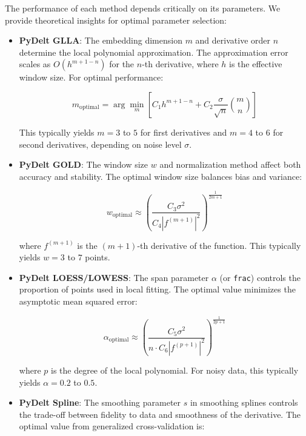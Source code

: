 \documentclass[10pt,journal,compsoc]{IEEEtran}
\begin{document}
The performance of each method depends critically on its parameters. We provide theoretical insights for optimal parameter selection:

\begin{itemize}
    \item \textbf{PyDelt GLLA}: The embedding dimension $m$ and derivative order $n$ determine the local polynomial approximation. The approximation error scales as $O(h^{m+1-n})$ for the $n$-th derivative, where $h$ is the effective window size. For optimal performance:
    
    \begin{equation}
        m_{\text{optimal}} = \arg\min_m \left[ C_1 h^{m+1-n} + C_2 \frac{\sigma}{\sqrt{n}} \binom{m}{n} \right]
    \end{equation}
    
    This typically yields $m = 3$ to $5$ for first derivatives and $m = 4$ to $6$ for second derivatives, depending on noise level $\sigma$.
    
    \item \textbf{PyDelt GOLD}: The window size $w$ and normalization method affect both accuracy and stability. The optimal window size balances bias and variance:
    
    \begin{equation}
        w_{\text{optimal}} \approx \left( \frac{C_3 \sigma^2}{C_4 |f^{(m+1)}|^2} \right)^{\frac{1}{2m+1}}
    \end{equation}
    
    where $f^{(m+1)}$ is the $(m+1)$-th derivative of the function. This typically yields $w = 3$ to $7$ points.
    
    \item \textbf{PyDelt LOESS/LOWESS}: The span parameter $\alpha$ (or \texttt{frac}) controls the proportion of points used in local fitting. The optimal value minimizes the asymptotic mean squared error:
    
    \begin{equation}
        \alpha_{\text{optimal}} \approx \left( \frac{C_5 \sigma^2}{n \cdot C_6 |f^{(p+1)}|^2} \right)^{\frac{1}{2p+1}}
    \end{equation}
    
    where $p$ is the degree of the local polynomial. For noisy data, this typically yields $\alpha = 0.2$ to $0.5$.
    
    \item \textbf{PyDelt Spline}: The smoothing parameter $s$ in smoothing splines controls the trade-off between fidelity to data and smoothness of the derivative. The optimal value from generalized cross-validation is:
    

\end{itemize}
\end{document}
